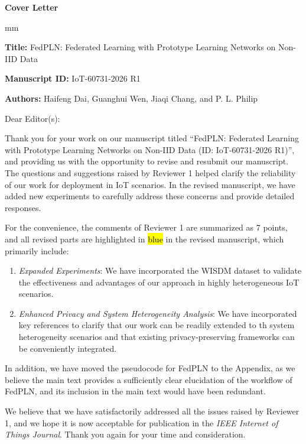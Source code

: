 \documentclass[a4paper,12pt]{article}
\newcommand{\hlb}[1]{\sethlcolor{b}\hl{#1}}
\begin{document}
\centerline{\Large \bf Cover Letter}
 mm

\medskip

\noindent
\textbf{Title:} {FedPLN: Federated Learning with Prototype Learning Networks on Non-IID Data}

\medskip

\noindent
\textbf{Manuscript ID:} {IoT-60731-2026 R1}

\medskip

\noindent
\textbf{Authors:} {Haifeng Dai, Guanghui Wen, Jiaqi Chang, and P. L. Philip}

\bigskip

\bigskip

\noindent
Dear Editor(s):

\bigskip

Thank you for your work on our manuscript titled ``FedPLN: Federated Learning with Prototype Learning Networks on Non-IID Data (ID: IoT-60731-2026 R1)'', and providing us with the opportunity to revise and resubmit our manuscript.
The questions and suggestions raised by Reviewer 1 helped clarify the reliability of our work for deployment in IoT scenarios.
In the revised manuscript, we have added new experiments to carefully address these concerns and provide detailed responses.

\medskip

For the convenience, the comments of Reviewer 1 are summarized as 7 points, and all revised parts are highlighted in \hlb{blue} in the revised manuscript, which primarily include:
\begin{enumerate}
    \item \textit{Expanded Experiments}: We have incorporated the WISDM dataset to validate the effectiveness and advantages of our approach in highly heterogeneous IoT scenarios.
    \item \textit{Enhanced Privacy and System Heterogeneity Analysis}: We have incorporated key references to clarify that our work can be readily extended to th system heterogeneity scenarios and that existing privacy-preserving frameworks can be conveniently integrated.
\end{enumerate}

\noindent
In addition, we have moved the pseudocode for FedPLN to the Appendix, as we believe the main text provides a sufficiently clear elucidation of the workflow of FedPLN, and its inclusion in the main text would have been redundant.

\medskip

We believe that we have satisfactorily addressed all the issues raised by Reviewer 1, and we hope it is now acceptable for publication in the \textit{IEEE Internet of Things Journal}.
Thank you again for your time and consideration.
\end{document}
